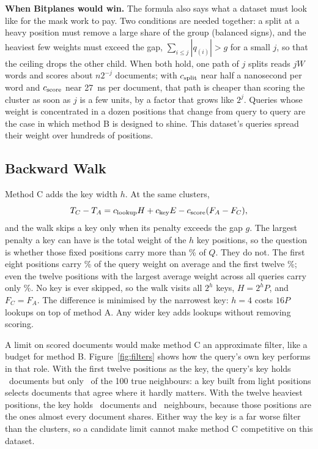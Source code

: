 \textbf{When Bitplanes would win.} The formula also says what a dataset must look like for
the mask work to pay. Two conditions are needed together: a split at a heavy position must
remove a large share of the group (balanced signs), and the heaviest few weights must
exceed the gap, $\sum_{i\le j}|q_{(i)}|>g$ for a small $j$, so that the ceiling drops the
other child. When both hold, one path of $j$ splits reads $jW$ words and scores about
$n2^{-j}$ documents; with $c_{\rm split}$ near half a nanosecond per word and
$c_{\rm score}$ near 27~ns per document, that path is cheaper than scoring the cluster as
soon as $j$ is a few units, by a factor that grows like $2^{j}$. Queries whose weight is
concentrated in a dozen positions that change from query to query are the case in which
method B is designed to shine. This dataset's queries spread their weight over hundreds of
positions.

\subsection{Backward Walk}
Method C adds the key width $h$. At the same clusters,
\begin{equation}
 T_C-T_A=c_{\rm lookup}H+c_{\rm key}E-c_{\rm score}(F_A-F_C),
\end{equation}
and the walk skips a key only when its penalty exceeds the gap $g$. The largest penalty a
key can have is the total weight of the $h$ key positions, so the question is whether those
fixed positions carry more than \gapShare\% of $Q$. They do not. The first eight positions
carry \keyFirstEightShare\% of the query weight on average and the first twelve
\keyFirstTwelveShare\%; even the twelve positions with the largest average weight across
all queries carry only \keyHeavyTwelveShare\%. No key is ever skipped, so the walk visits all
$2^h$ keys, $H=2^hP$, and $F_C=F_A$. The difference is minimised by the narrowest key:
$h=4$ costs $16P$ lookups on top of method A. Any wider key adds lookups without removing
scoring.

A limit on scored documents would make method C an approximate filter, like a budget for
method B. Figure~\ref{fig:filters} shows how the query's own key performs in that role.
With the first twelve positions as the key, the query's key holds \keyFirstTwelveDocs\
documents but only \keyFirstTwelveNeighbours\ of the 100 true neighbours: a key built from
light positions selects documents that agree where it hardly matters. With the twelve
heaviest positions, the key holds \keyHeavyTwelveDocs\ documents and
\keyHeavyTwelveNeighbours\ neighbours, because those positions are the ones almost every
document shares. Either way the key is a far worse filter than the clusters, so a candidate
limit cannot make method C competitive on this dataset.

